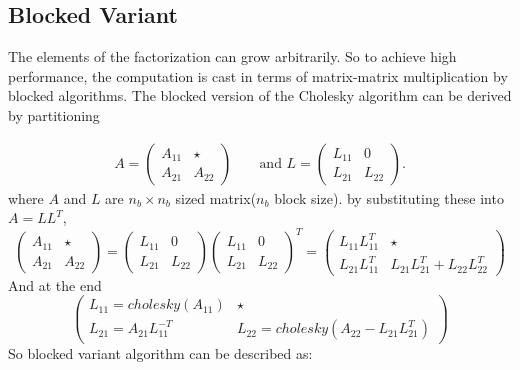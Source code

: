 \subsection*{Blocked Variant}
The elements of the factorization can grow arbitrarily. So to achieve high performance, the computation is cast in terms of matrix-matrix multiplication by blocked algorithms. The blocked version of the Cholesky algorithm can be derived by partitioning

\begin{equation*}
\begin{aligned}
	A=
	\left(
\begin{array}{c|c}
A_{11}  & \star \\ \hline
A_{21} & A_{22}
\end{array}
\right)
& &
\text{ and }
L=
\left(
\begin{array}{c|c}
L_{11}  & 0 \\ \hline
L_{21} & L_{22}
\end{array}\right).	
\end{aligned}
\end{equation*}
where $A$ and $L$ are $n_b\times n_b$ sized matrix($n_b$ block size). by substituting these into $A=LL^T$,
\begin{equation*}
\left(
\begin{array}{c|c}
A_{11}  & \star \\ \hline
A_{21} & A_{22}
\end{array}
\right)
=
\left(
\begin{array}{c|c}
L_{11}  & 0 \\ \hline
L_{21} & L_{22}
\end{array}\right)
\left(
\begin{array}{c|c}
L_{11}  & 0 \\ \hline
L_{21} & L_{22}
\end{array}
\right)^T
=
\left(
\begin{array}{c|c}
L_{11}L_{11}^T  & \star \\ \hline
L_{21}L_{11}^T & L_{21}L_{21}^T+L_{22}L_{22}^T
\end{array}
\right)
\end{equation*}
And at the end
\begin{equation*}
	\left(
\begin{array}{c|c}
L_{11} = cholesky({A_{11}})  & \star \\ \hline
L_{21} = A_{21}L_{11}^{-T} & L_{22} = cholesky(A_{22}-L_{21}L_{21}^T)
\end{array}
\right)
\end{equation*}
So blocked variant algorithm can be described as:



